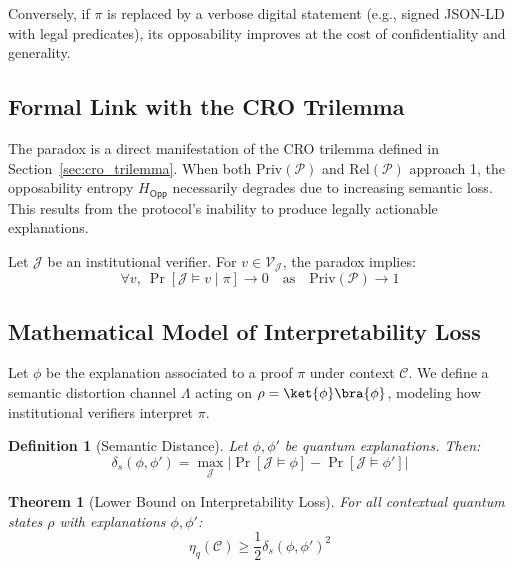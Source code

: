 \documentclass[preprint,12pt]{elsarticle}
\newtheorem{definition}{Definition}[section]
\newtheorem{theorem}{Theorem}[section]
\begin{document}
            Conversely, if $\pi$ is replaced by a verbose digital statement (e.g., signed JSON-LD with legal predicates), its opposability improves at the cost of confidentiality and generality.

        \subsection{Formal Link with the CRO Trilemma}\label{subsec:paradox_formal_link}

            The paradox is a direct manifestation of the CRO trilemma defined in Section~\ref{sec:cro_trilemma}. When both $\mathrm{Priv}(\mathcal{P})$ and $\mathrm{Rel}(\mathcal{P})$ approach 1, the opposability entropy $H_{\mathsf{Opp}}$ necessarily degrades due to increasing semantic loss. This results from the protocol’s inability to produce legally actionable explanations.

            Let $\mathcal{J}$ be an institutional verifier. For $v \in \mathcal{V}_{\mathcal{J}}$, the paradox implies:
            \begin{equation}\label{eq:paradox_formal_link}
                \forall v, \ \Pr[\mathcal{J} \models v \mid \pi] \to 0 \quad \text{as} \quad \mathrm{Priv}(\mathcal{P}) \to 1
            \end{equation}

        \subsection{Mathematical Model of Interpretability Loss}\label{subsec:paradox_model}

            Let $\phi$ be the explanation associated to a proof $\pi$ under context $\mathcal{C}$. We define a semantic distortion channel $\Lambda$ acting on $\rho = \ket{\phi}\bra{\phi}$, modeling how institutional verifiers interpret $\pi$.

            \begin{definition}[Semantic Distance]\label{def:semantic_distance}
                Let $\phi, \phi'$ be quantum explanations. Then:
                \begin{equation}\label{eq:semantic_distance}
                    \delta_s(\phi, \phi') = \max_{\mathcal{J}} \left| \Pr[\mathcal{J} \models \phi] - \Pr[\mathcal{J} \models \phi'] \right|
                \end{equation}
            \end{definition}

            \begin{theorem}[Lower Bound on Interpretability Loss]\label{thm:lower_bound_inter_loss}
                For all contextual quantum states $\rho$ with explanations $\phi, \phi'$:
                \begin{equation}\label{eq:lower_bound_inter_loss}
                    \eta_q(\mathcal{C}) \geq \frac{1}{2} \delta_s(\phi, \phi')^2
                \end{equation}
            \end{theorem}
\end{document}
